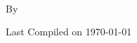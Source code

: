 \pagestyle{empty} %

{
\centering

~

\vspace{24pt}
{\scshape\Huge \booktitle \par} %
\vspace{12pt}
{\large By \authorname \par} %

\vfill %
{\large Last Compiled on \today \par} %
}




